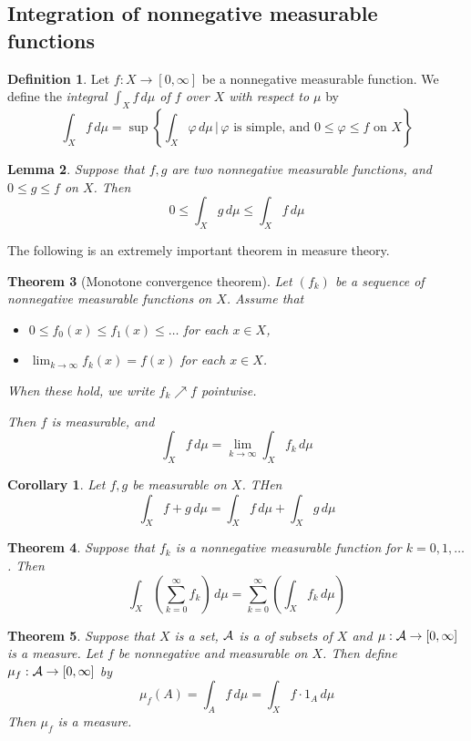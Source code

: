 \documentclass[10pt, oneside, reqno]{amsart}
\theoremstyle{plain}%
\newtheorem{thm}{Theorem}[section]
\newtheorem{lem}[thm]{Lemma}
\newtheorem*{cor}{Corollary}
\theoremstyle{definition}
\newtheorem{defn}[thm]{Definition}
\theoremstyle{remark}
\newcommand{\given}{ \, | \,}
\newcommand{\dmu}{\, d \mu}
\renewcommand{\phi}{\varphi}
\begin{document}
\subsection{Integration of nonnegative measurable functions} %
\label{sub:integration_of_nonnegative_measurable_functions}



\begin{defn}Let $f: X \rightarrow [0, \infty]$ be a nonnegative measurable function.  We define the \emph{integral $\int_X f \dmu$ of $f$ over $X$ with respect to $\mu$} by \[
	\int_X f \dmu = \sup \left\{ \int_X \phi \dmu \given \phi \text{ is simple, and } 0 \leq \phi \leq f \text{ on } X \right\}
	\]
\end{defn}

\begin{lem}
	Suppose that $f,g$ are two nonnegative measurable functions, and $0 \leq g \leq f$
 on $X$.  Then \[
 	0 \leq \int_X g \dmu \leq \int_X f \dmu
 \]\end{lem}

The following is an extremely important theorem in measure theory. 
\begin{thm}[Monotone convergence theorem]
	Let $(f_k)$ be a sequence of nonnegative measurable functions on $X$.  Assume that \begin{itemize}
		\item $ 0 \leq f_0(x) \leq f_1(x) \leq \dots$ for each $x \in X$,
		\item $\lim_{k \rightarrow \infty} f_k(x) = f(x)$ for each $x \in X$.
	\end{itemize}
	When these hold, we write $f_k \nearrow f$ pointwise.  
	
	Then $f$ is measurable, and \[
		\int_X f \dmu = \lim_{ k \rightarrow \infty} \int_X f_k \dmu
	\] 
\end{thm}

\begin{cor}
	Let $f,g$ be measurable on $X$.  THen \[
		\int_X f + g \dmu = \int_X f \dmu + \int_X g \dmu
	\]
\end{cor}

\begin{thm}
	Suppose that $f_k$ is a nonnegative measurable function for $k = 0,1,\dots$.  Then \[
		\int_X \left(\sum_{k=0}^\infty f_k \right) \dmu = \sum_{k=0}^\infty \left( \int_X f_k \dmu \right)
	\]
\end{thm}

\begin{thm}
	Suppose that $X$ is a set, $\mathcal{A}$ is a \sig of subsets of $X$ and $\mu: \mathcal{A} \rightarrow [0,\infty]$ is a measure.  Let $f$ be nonnegative and measurable on $X$.  Then define $\mu_f : \mathcal{A} \rightarrow [0,\infty]$ by \[
		\mu_f(A) = \int_A f \dmu = \int_X f \cdot 1_A \dmu
	\]
	Then $\mu_f$ is a measure.
\end{thm}
\end{document}
